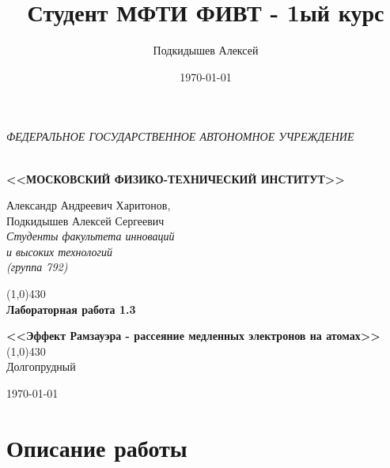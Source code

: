 \documentclass[a4paper,12pt]{article}
\author{Подкидышев Алексей}
\title{Студент МФТИ ФИВТ - 1ый курс}
\date{\today}
\theoremstyle{plain} %
\theoremstyle{definition} %
\theoremstyle{remark} %
\renewcommand{\headrulewidth}{0mm}  %
\begin{document}

\begin{center}
	\textit{\MakeTextUppercase{федеральное государственное автономное учреждение}}
		
	\vspace{0.5ex}
	
	\textbf{ \\ \MakeTextUppercase{<<Московский Физико-технический институт>>}}
\end{center}
\vspace{13ex}
\begin{flushright}
	\noindent
	{Александр Андреевич Харитонов,\\
	Подкидышев Алексей Сергеевич}
	\\
	\textit{Студенты факультета инноваций\\ и высоких технологий\\(группа 792)}
\end{flushright}
\begin{center}
	\vspace{23ex}
	\line(1,0){430}\\[4ex]
	{\LARGE\textbf{Лабораторная работа 1.3}}
	\vspace{2ex}
	
		
	\textbf{\large{<<Эффект Рамзауэра - рассеяние медленных электронов на атомах>>}}\\[3ex]
	\line(1,0){430}\\[5ex]
	\vfill
	Долгопрудный 
	
	{\today}
\end{center}

\newpage
\tableofcontents
\newpage
\renewcommand{\headrulewidth}{1pt}

\section{Описание работы}
\end{document}
